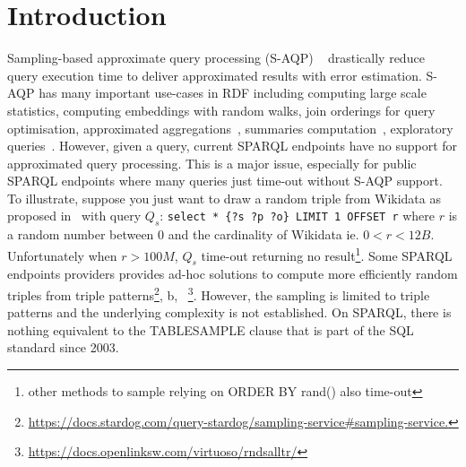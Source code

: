 
\section{Introduction}

Sampling-based approximate query processing (S-AQP)
~\cite{DBLP:conf/sigmod/AgarwalMKTJMMS14} drastically reduce query
execution time to deliver approximated results with error
estimation. S-AQP has many important use-cases in RDF including
computing large scale
statistics\cite{soulet2019anytime,10.1007/978-3-319-18818-8_14},
computing embeddings with random walks\cite{ristoski2016rdf2vec}, join
orderings for query optimisation\cite{DBLP:conf/cidr/LeisRGK017},
approximated
aggregations~\cite{DBLP:journals/tods/LiWYZ19,DBLP:conf/cikm/00010XYPZ2},
summaries computation~\cite{10.1007/978-3-030-49461-2_10}, exploratory
queries~\cite{DBLP:conf/sigmod/AgarwalMKTJMMS14}.  However, given a
query, current SPARQL endpoints have no support for approximated query
processing. This is a major issue, especially  for public SPARQL endpoints where
many queries just time-out without S-AQP support. To illustrate, suppose you just want to draw a
random triple from Wikidata as proposed in~\cite{soulet2019anytime} with query $Q_s$:
%
\verb+select * {?s ?p ?o} LIMIT 1 OFFSET r+
%
where $r$ is a random number between 0 and the cardinality of Wikidata
 ie. $0<r<12B$. Unfortunately when $r>100M$,
$Q_s$ time-out  returning no result\footnote{other methods
  to sample relying on ORDER BY rand() also time-out}. Some SPARQL endpoints
  providers provides ad-hoc solutions to compute more efficiently
  random triples from triple
  patterns\footnote{\url{https://docs.stardog.com/query-stardog/sampling-service\#sampling-service.}},
  b,
  ~\footnote{\url{https://docs.openlinksw.com/virtuoso/rndsalltr/}}. However,
   the sampling is
  limited to triple patterns and the underlying complexity is not
  established. On SPARQL, there is nothing equivalent to the
  TABLESAMPLE clause that is part of the SQL standard since 2003.


